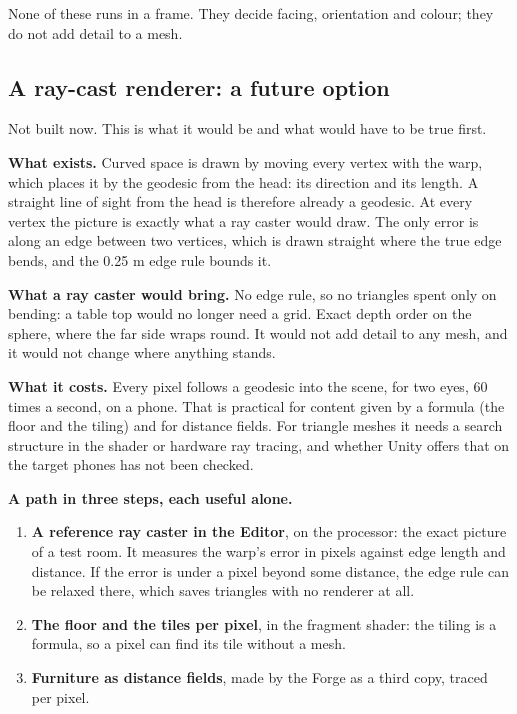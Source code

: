 \documentclass[10pt]{article}
\begin{document}
None of these runs in a frame. They decide facing, orientation and colour; they do not add detail to a mesh.

\subsection{A ray-cast renderer: a future option}

Not built now. This is what it would be and what would have to be true first.

\textbf{What exists.} Curved space is drawn by moving every vertex with the warp, which places it by the geodesic from the
head: its direction and its length. A straight line of sight from the head is therefore already a geodesic. At every vertex
the picture is exactly what a ray caster would draw. The only error is along an edge between two vertices, which is drawn
straight where the true edge bends, and the 0.25 m edge rule bounds it.

\textbf{What a ray caster would bring.} No edge rule, so no triangles spent only on bending: a table top would no longer need
a grid. Exact depth order on the sphere, where the far side wraps round. It would not add detail to any mesh, and it would
not change where anything stands.

\textbf{What it costs.} Every pixel follows a geodesic into the scene, for two eyes, 60 times a second, on a phone. That is
practical for content given by a formula (the floor and the tiling) and for distance fields. For triangle meshes it needs a
search structure in the shader or hardware ray tracing, and whether Unity offers that on the target phones has not been
checked.

\textbf{A path in three steps, each useful alone.}
\begin{enumerate}[leftmargin=6mm]
\item \textbf{A reference ray caster in the Editor}, on the processor: the exact picture of a test room. It measures the warp's
error in pixels against edge length and distance. If the error is under a pixel beyond some distance, the edge rule can be
relaxed there, which saves triangles with no renderer at all.
\item \textbf{The floor and the tiles per pixel}, in the fragment shader: the tiling is a formula, so a pixel can find its tile
without a mesh.
\item \textbf{Furniture as distance fields}, made by the Forge as a third copy, traced per pixel.
\end{enumerate}
\end{document}
